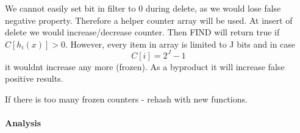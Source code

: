 \documentclass[12pt]{article}
\begin{document}
We cannot easily set bit in filter to 0 during delete, as we would lose false negative property. Therefore a helper counter array will be used.
At insert of delete we would increase/decrease counter. Then FIND will return true if $ C[h_i(x)] > 0 $. However, every item in array is limited to J bits and in case \[ C[i] = 2^J-1 \] it wouldnt increase any more (frozen). As a byproduct it will increase false positive results.

If there is too many frozen counters - rehash with new functions.

\paragraph{Analysis}
\end{document}
